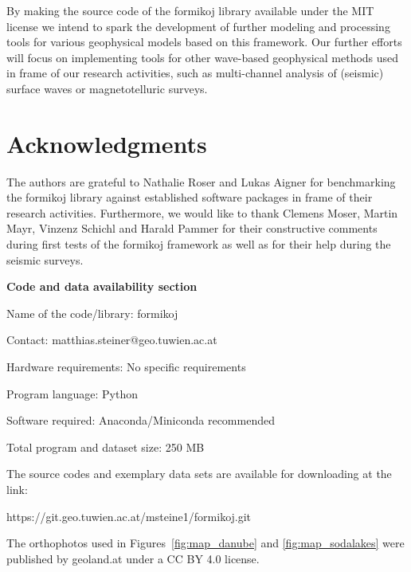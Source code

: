 \documentclass[a4paper,fleqn]{cas-sc}
\begin{document}
By making the source code of the formikoj library available under the MIT license we intend to spark the development of further modeling and processing tools for various geophysical models based on this framework. Our further efforts will focus on implementing tools for other wave-based geophysical methods used in frame of our research activities, such as multi-channel analysis of (seismic) surface waves or magnetotelluric surveys. 

\section{Acknowledgments}

The authors are grateful to Nathalie Roser and Lukas Aigner for benchmarking the formikoj library against established software packages in frame of their research activities. Furthermore, we would like to thank Clemens Moser, Martin Mayr, Vinzenz Schichl and Harald Pammer for their constructive comments during first tests of the formikoj framework as well as for their help during the seismic surveys.

\newpage

\textbf{Code and data availability section}

Name of the code/library: formikoj

Contact: matthias.steiner@geo.tuwien.ac.at

Hardware requirements: No specific requirements

Program language: Python
 
Software required: Anaconda/Miniconda recommended

Total program and dataset size: 250 MB

The source codes and exemplary data sets are available for downloading at the link:

https://git.geo.tuwien.ac.at/msteine1/formikoj.git

The orthophotos used in Figures~\ref{fig:map_danube} and \ref{fig:map_sodalakes} were published by geoland.at under a CC BY 4.0 license.


 
\end{document}
